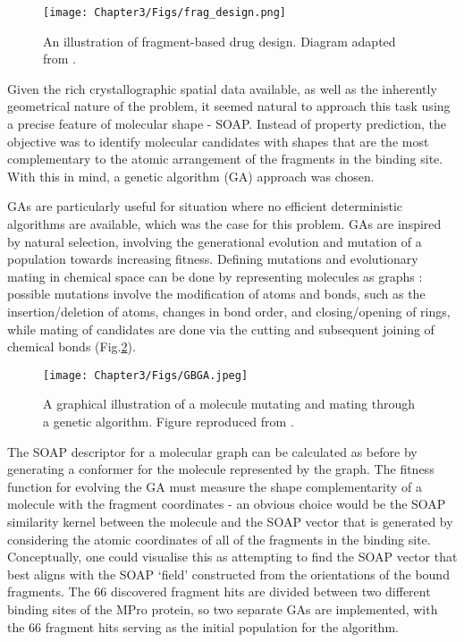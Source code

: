 \begin{figure}[!h] %
\centering
\texttt{[image: Chapter3/Figs/frag\_design.png]}
\caption{\label{fig:frag} An illustration of fragment-based drug design. Diagram adapted from \cite{fragpic}.}
\end{figure}

Given the rich crystallographic spatial data available, as well as the inherently geometrical nature of the problem, it seemed natural to approach this task using a precise feature of molecular shape - SOAP. Instead of property prediction, the objective was to identify molecular candidates with shapes that are the most complementary to the atomic arrangement of the fragments in the binding site. With this in mind, a genetic algorithm (GA) approach was chosen.

GAs are particularly useful for situation where no efficient deterministic algorithms are available, which was the case for this problem. GAs are inspired by natural selection, involving the generational evolution and mutation of a population towards increasing fitness. Defining mutations and evolutionary mating in chemical space can be done by representing molecules as graphs \cite{Jensen19}: possible mutations involve the modification of atoms and bonds, such as the insertion/deletion of atoms, changes in bond order, and closing/opening of rings, while mating of candidates are done via the cutting and subsequent joining of chemical bonds (Fig.\ref{fig:GBGA}).

\begin{figure}[!h] %
\centering
\texttt{[image: Chapter3/Figs/GBGA.jpeg]}
\caption{\label{fig:GBGA} A graphical illustration of a molecule mutating and mating through a genetic algorithm. Figure reproduced from \cite{Virshup13}.}
\end{figure}

The SOAP descriptor for a molecular graph can be calculated as before by generating a conformer for the molecule represented by the graph. The fitness function for evolving the GA must measure the shape complementarity of a molecule with the fragment coordinates - an obvious choice would be the SOAP similarity kernel between the molecule and the SOAP vector that is generated by considering the atomic coordinates of all of the fragments in the binding site. Conceptually, one could visualise this as attempting to find the SOAP vector that best aligns with the SOAP `field' constructed from the orientations of the bound fragments. The 66 discovered fragment hits are divided between two different binding sites of the MPro protein, so two separate GAs are implemented, with the 66 fragment hits serving as the initial population for the algorithm.

